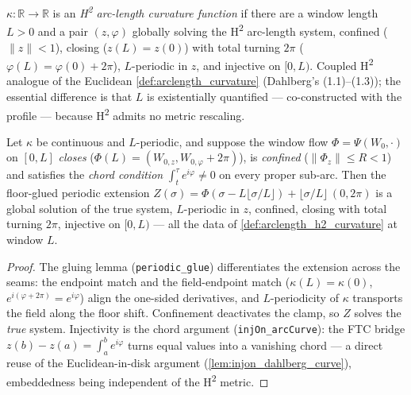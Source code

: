 \begin{definition}
  \label{def:arclength_h2_curvature}
  $\kappa:\mathbb R\to\mathbb R$ is an \emph{H\textsuperscript{2} arc-length
  curvature function} if there are a window length $L>0$ and a pair
  $(z,\varphi)$ globally solving the H\textsuperscript{2} arc-length system,
  confined ($\|z\|<1$), closing ($z(L)=z(0)$) with total turning $2\pi$
  ($\varphi(L)=\varphi(0)+2\pi$), $L$-periodic in $z$, and injective on
  $[0,L)$. Coupled H\textsuperscript{2} analogue of the Euclidean
  \cref{def:arclength_curvature} (Dahlberg's (1.1)--(1.3)); the essential
  difference is that $L$ is existentially quantified — co-constructed with the
  profile — because H\textsuperscript{2} admits no metric rescaling.
\end{definition}

\begin{lemma}
  \label{lem:window_solution_exposed}
  Let $\kappa$ be continuous and $L$-periodic, and suppose the window flow
  $\Phi=\Psi(W_0,\cdot)$ on $[0,L]$ \emph{closes}
  ($\Phi(L)=(W_{0,z},W_{0,\varphi}+2\pi)$), is \emph{confined}
  ($\|\Phi_z\|\le R<1$) and satisfies the \emph{chord condition}
  $\int_t^\tau e^{i\varphi}\ne0$ on every proper sub-arc. Then the floor-glued
  periodic extension
  $Z(\sigma)=\Phi(\sigma-L\lfloor\sigma/L\rfloor)
  +\lfloor\sigma/L\rfloor\,(0,2\pi)$
  is a global solution of the true system, $L$-periodic in $z$, confined,
  closing with total turning $2\pi$, injective on $[0,L)$ — all the data of
  \cref{def:arclength_h2_curvature} at window $L$.
\end{lemma}

\begin{proof}
  \leanok
  The gluing lemma (\texttt{periodic\_glue}) differentiates the extension
  across the seams: the endpoint match and the field-endpoint match
  ($\kappa(L)=\kappa(0)$, $e^{i(\varphi+2\pi)}=e^{i\varphi}$) align the
  one-sided derivatives, and $L$-periodicity of $\kappa$ transports the field
  along the floor shift. Confinement deactivates the clamp, so $Z$ solves the
  \emph{true} system. Injectivity is the chord argument
  (\texttt{injOn\_arcCurve}): the FTC bridge $z(b)-z(a)=\int_a^b e^{i\varphi}$
  turns equal values into a vanishing chord — a direct reuse of the
  Euclidean-in-disk argument (\cref{lem:injon_dahlberg_curve}), embeddedness
  being independent of the H\textsuperscript{2} metric.
\end{proof}


